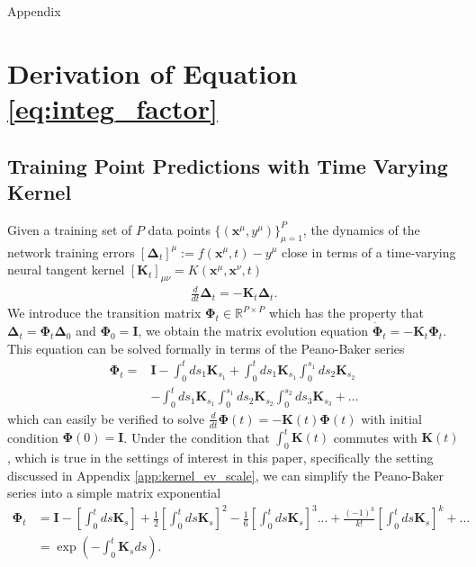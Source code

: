 \documentclass{article} %
\def\x{\bm x}
\begin{document}
\newpage 
\begin{appendix}

{\Large Appendix}



\section{Derivation of Equation \ref{eq:integ_factor}}\label{app:integrating_factor}

\subsection{Training Point Predictions with Time Varying Kernel}\label{app:integrating_factor1}
Given a training set of $P$ data points $\{ (\x^\mu, y^\mu) \}_{\mu=1}^P$, the dynamics of the network training errors $[\bm \Delta_t]^\mu := f(\bm x^\mu, t) - y^\mu$ close in terms of a time-varying neural tangent kernel $[\bm K_t]_{\mu \nu} = K(\bm x^\mu, \bm x^\nu, t)$
\begin{align}
    \frac{d}{dt} \bm\Delta_t = - \bm K_t \bm \Delta_t .
\end{align}
We introduce the transition matrix $\bm\Phi_t \in \mathbb{R}^{P \times P}$ which has the property that $\bm\Delta_t = \bm \Phi_t \bm\Delta_0$ and $\bm\Phi_0 = \bm I$, we obtain the matrix evolution equation $\dot{\bm\Phi}_t = - \bm K_t \bm \Phi_t$. This equation can be solved formally in terms of the Peano-Baker series \citep{baake2011peano, brockett2015finite}
\begin{align}
    \bm\Phi_t = & \bm I - \int_0^t ds_1 \bm K_{s_1}  + \int_0^t ds_1 \bm K_{s_1} \int_0^{s_1} ds_2   \bm K_{s_2}
    \\
    &- \int_0^t ds_1 \bm K_{s_1}\int_0^{s_1} ds_2 \bm K_{s_2} \int_0^{s_2} ds_3 \bm K_{s_3}+ ... 
\end{align}
which can easily be verified to solve $\frac{d}{dt} \bm \Phi(t) = - \bm K(t) \bm \Phi(t)$ with initial condition $\bm\Phi(0) = \bm I$. Under the condition that $\int_0^t \bm K(t)$ commutes with $\bm K(t)$, which is true in the settings of interest in this paper, specifically the setting discussed in Appendix \ref{app:kernel_ev_scale}, we can simplify the Peano-Baker series into a simple matrix exponential
\begin{align}
    \bm\Phi_t &= \bm I - \left[ \int_0^t ds \bm K_s \right] + \frac{1}{2} \left[ \int_0^t ds \bm K_s \right]^2 - \frac{1}{6} \left[ \int_0^t ds \bm K_s \right]^3  ... + \frac{(-1)^k}{k!} \left[ \int_0^t ds \bm K_s \right]^k + ... \nonumber
    \\
    &= \exp\left( - \int_0^t \bm K_s ds \right) .
\end{align}


\end{appendix}
\end{document}

